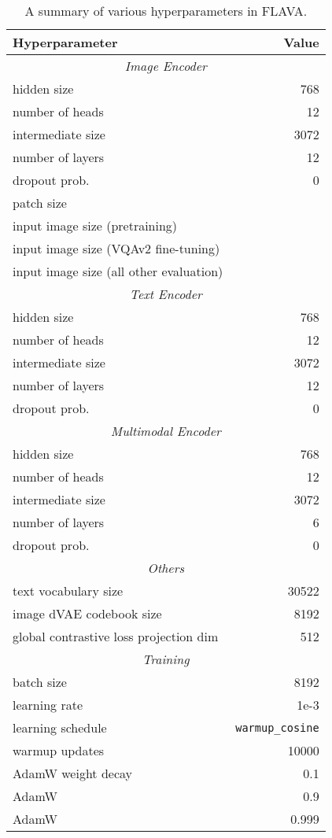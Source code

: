 \documentclass[10pt,twocolumn,letterpaper]{article}
\begin{document}
\begin{table}[b]
\small
\begin{center}
\begin{tabular}{@{}lr@{}}
\toprule
\textbf{Hyperparameter} & \textbf{Value} \\
\midrule
\multicolumn{2}{c}{\textit{Image Encoder}} \\
\midrule
hidden size & 768 \\
number of heads & 12 \\
intermediate size & 3072 \\
number of layers & 12 \\
dropout prob. & 0 \\
patch size &  \\
input image size (pretraining) &  \\
input image size (VQAv2 fine-tuning) &  \\
input image size (all other evaluation) &  \\
\midrule
\multicolumn{2}{c}{\textit{Text Encoder}} \\
\midrule
hidden size & 768 \\
number of heads & 12 \\
intermediate size & 3072 \\
number of layers & 12 \\
dropout prob. & 0 \\
\midrule
\multicolumn{2}{c}{\textit{Multimodal Encoder}} \\
\midrule
hidden size & 768 \\
number of heads & 12 \\
intermediate size & 3072 \\
number of layers & 6 \\
dropout prob. & 0 \\
\midrule
\multicolumn{2}{c}{\textit{Others}} \\
\midrule
text vocabulary size & 30522 \\
image dVAE codebook size & 8192 \\
global contrastive loss projection dim & 512 \\
\midrule
\multicolumn{2}{c}{\textit{Training}} \\
\midrule
batch size & 8192 \\
learning rate & 1e-3 \\
learning schedule & \texttt{warmup\_cosine} \\
warmup updates & 10000\\
AdamW weight decay & 0.1 \\ 
AdamW  & 0.9 \\
AdamW  & 0.999 \\
\bottomrule
\end{tabular}
\end{center}
\vspace{-1.5em}
\caption{A summary of various hyperparameters in FLAVA.}
\label{tab:supp_hyper-parameters}
\end{table}
\end{document}
